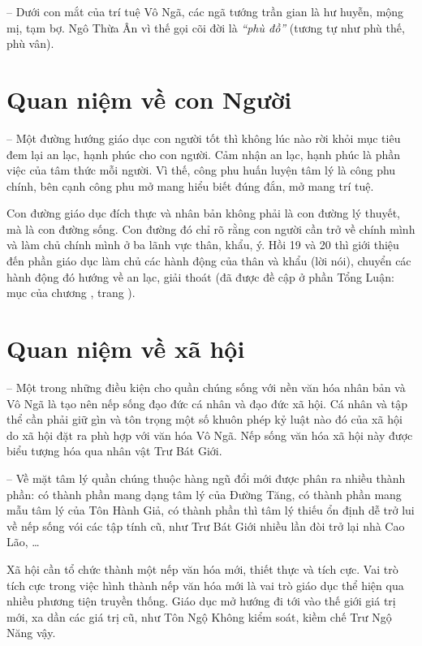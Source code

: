 -- Dưới con mắt của trí tuệ Vô Ngã, các ngã tướng trần gian là hư huyễn, mộng mị, tạm bợ. Ngô Thừa Ân vì thế gọi cõi đời là \emph{``phù đồ''} (tương tự như phù thế, phù vân).

\section{Quan niệm về con Người} %
\label{sec:18_19_con_nguoi}

-- Một đường hướng giáo dục con người tốt thì không lúc nào rời khỏi mục tiêu đem lại an lạc, hạnh phúc cho con người. Cảm nhận an lạc, hạnh phúc là phần việc của tâm thức mỗi người. Vì thế, công phu huấn luyện tâm lý là công phu chính, bên cạnh công phu mở mang hiểu biết đúng đắn, mở mang trí tuệ.

Con đường giáo dục đích thực và nhân bản không phải là con đường lý thuyết, mà là con đường sống. Con đường đó chỉ rõ rằng con người cần trở về chính mình và làm chủ chính mình ở ba lãnh vực thân, khẩu, ý. Hồi 19 và 20 thì giới thiệu đến phần giáo dục làm chủ các hành động của thân và khẩu (lời nói), chuyển các hành động đó hướng về an lạc, giải thoát (đã được đề cập ở phần Tổng Luận: mục  của chương , trang \pageref{sec:qua_cac_nhan_vat_chinh}).

\section{Quan niệm về xã hội} %
\label{sec:18_19_xa_hoi}

-- Một trong những điều kiện cho quần chúng sống với nền văn hóa nhân bản và Vô Ngã là tạo nên nếp sống đạo đức cá nhân và đạo đức xã hội. Cá nhân và tập thể cần phải giữ gìn và tôn trọng một số khuôn phép kỷ luật nào đó của xã hội do xã hội đặt ra phù hợp với văn hóa Vô Ngã. Nếp sống văn hóa xã hội này được biểu tượng hóa qua nhân vật Trư Bát Giới.

-- Về mặt tâm lý quần chúng thuộc hàng ngũ đổi mới được phân ra nhiều thành phần: có thành phần mang dạng tâm lý của Đường Tăng, có thành phần mang mẫu tâm lý của Tôn Hành Giả, có thành phần thì tâm lý thiếu ổn định dễ trở lui về nếp sống vói các tập tính cũ, như Trư Bát Giới nhiều lần đòi trở lại nhà Cao Lão, \ldots

Xã hội cần tổ chức thành một nếp văn hóa mới, thiết thực và tích cực. Vai trò tích cực trong việc hình thành nếp văn hóa mới là vai trò giáo dục thể hiện qua nhiều phương tiện truyền thống. Giáo dục mở hướng đi tới vào thế giới giá trị mới, xa dần các giá trị cũ, như Tôn Ngộ Không kiểm soát, kiềm chế Trư Ngộ Năng vậy.
